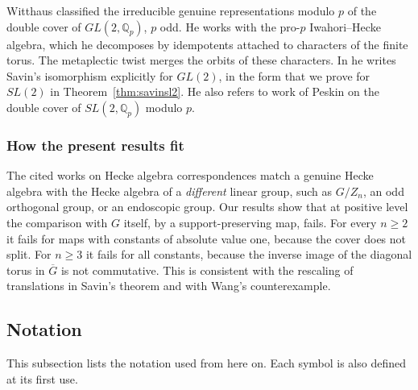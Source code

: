 \documentclass[12pt,letterpaper]{amsart}
\numberwithin{equation}{section}
\theoremstyle{definition}
\theoremstyle{remark}
\newcommand{\Gbar}{\overline{G}}
\begin{document}
Witthaus \cite{Wi22} classified the irreducible genuine representations
modulo $p$ of the double cover of $GL(2,\mathbb{Q}_p)$, $p$ odd. He
works with the pro-$p$ Iwahori--Hecke algebra, which he decomposes by
idempotents attached to characters of the finite torus. The metaplectic
twist merges the orbits of these characters. In \cite[\S6.1]{Wi22} he
writes Savin's isomorphism explicitly for $GL(2)$, in the form that we
prove for $SL(2)$ in Theorem~\ref{thm:savinsl2}. He also refers to work
of Peskin \cite{Pe14} on the double cover of $SL(2,\mathbb{Q}_p)$
modulo $p$.

\subsubsection{How the present results fit}
The cited works on Hecke algebra correspondences match a genuine
Hecke algebra with the Hecke algebra of a \emph{different} linear
group, such as $G/Z_n$, an odd orthogonal group, or an endoscopic
group. Our results show that at positive level the comparison with $G$
itself, by a support-preserving map, fails. For every $n\geq 2$ it
fails for maps with constants of absolute value one, because the cover
does not split. For $n\geq 3$ it fails for all constants, because the
inverse image of the diagonal torus in $\Gbar$ is not commutative. This is consistent with the rescaling of translations in
Savin's theorem and with Wang's counterexample.

\subsection{Notation}
\label{section:notation}

This subsection lists the notation used from here on. Each symbol is also
defined at its first use.
\end{document}
